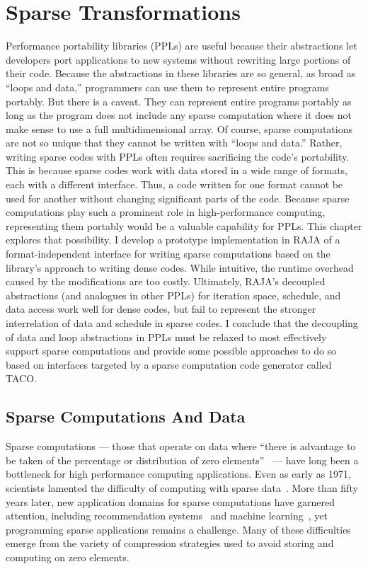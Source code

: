 \chapter{Sparse Transformations}\label{chap:SparseRAJA}

Performance portability libraries (PPLs) are useful because their abstractions let developers port applications to new systems without rewriting large portions of their code.
Because the abstractions in these libraries are so general, as broad as ``loops and data,'' programmers can use them to represent entire programs portably.
But there is a caveat. 
They can represent entire programs portably as long as the program does not include any sparse computation where it does not make sense to use a full multidimensional array.
Of course, sparse computations are not so unique that they cannot be written with ``loops and data.''
Rather, writing sparse codes with PPLs often requires sacrificing the code's portability.
This is because sparse codes work with data stored in a wide range of formats, each with a different interface.
Thus, a code written for one format cannot be used for another without changing significant parts of the code.
Because sparse computations play such a prominent role in high-performance computing, representing them portably would be a valuable capability for PPLs\@.
This chapter explores that possibility.
I develop a prototype implementation in RAJA of a format-independent interface for writing sparse computations based on the library's approach to writing dense codes.
While intuitive, the runtime overhead caused by the modifications are too costly.
Ultimately, RAJA's decoupled abstractions (and analogues in other PPLs) for iteration space, schedule, and data access work well for dense codes, but fail to represent the stronger interrelation of data and schedule in sparse codes.
I conclude that the decoupling of data and loop abstractions in PPLs must be relaxed to most effectively support sparse computations and provide some possible approaches to do so based on interfaces targeted by a sparse computation code generator called TACO\@.


\section{Sparse Computations And Data}

Sparse computations --- those that operate on data where ``there is advantage to be taken of the percentage or distribution of zero elements''~\cite{duff1977survey} --- have long been a bottleneck for high performance computing applications. 
Even as early as 1971, scientists lamented the difficulty of computing with sparse data~\cite{willoughby1971sparse}.
More than fifty years later, new application domains for sparse computations have garnered attention, including recommendation systems~\cite{he2016fusing} and machine learning~\cite{zhao2018bridging,zhu2019sparse}, yet programming sparse applications remains a challenge.
Many of these difficulties emerge from the variety of compression strategies used to avoid storing and computing on zero elements.


